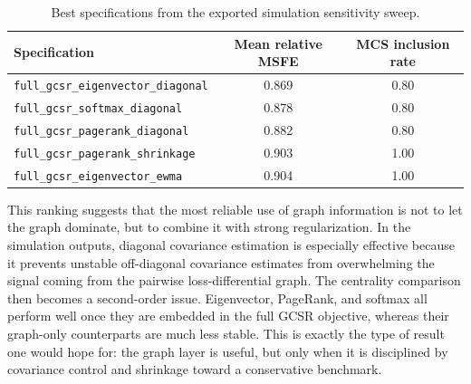 \documentclass[11pt,a4paper]{article}
\begin{document}
\begin{table}[htbp]
\centering
\small
\begin{tabular}{lcc}
\toprule
Specification & Mean relative MSFE & MCS inclusion rate \\
\midrule
\texttt{full\_gcsr\_eigenvector\_diagonal} & 0.869 & 0.80 \\
\texttt{full\_gcsr\_softmax\_diagonal} & 0.878 & 0.80 \\
\texttt{full\_gcsr\_pagerank\_diagonal} & 0.882 & 0.80 \\
\texttt{full\_gcsr\_pagerank\_shrinkage} & 0.903 & 1.00 \\
\texttt{full\_gcsr\_eigenvector\_ewma} & 0.904 & 1.00 \\
\bottomrule
\end{tabular}
\caption{Best specifications from the exported simulation sensitivity sweep.}
\label{tab:sweep}
\end{table}

This ranking suggests that the most reliable use of graph information is not to let the graph dominate, but to combine it with strong regularization. In the simulation outputs, diagonal covariance estimation is especially effective because it prevents unstable off-diagonal covariance estimates from overwhelming the signal coming from the pairwise loss-differential graph. The centrality comparison then becomes a second-order issue. Eigenvector, PageRank, and softmax all perform well once they are embedded in the full GCSR objective, whereas their graph-only counterparts are much less stable. This is exactly the type of result one would hope for: the graph layer is useful, but only when it is disciplined by covariance control and shrinkage toward a conservative benchmark.
\end{document}
